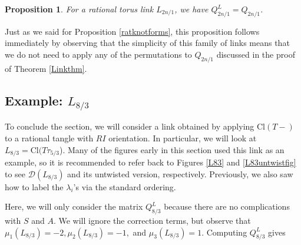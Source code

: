 \documentclass[11pt]{amsart}
\theoremstyle{plain}
\newtheorem{propositionN}[theoremN]{Proposition}
\theoremstyle{definition}
\theoremstyle{remark}
\begin{document}
\begin{propositionN}
\label{toruslinkprop}
For a rational torus link $L_{2n/1}$, we have $Q_{2n/1}^L=Q_{2n/1}$.
\end{propositionN}

Just as we said for Proposition \ref{ratknotforms}, this proposition follows immediately by observing that the simplicity of this family of links means that we do not need to apply any of the permutations to $Q_{2n/1}$ discussed in the proof of Theorem \ref{Linkthm}. 

\subsection{Example: $L_{8/3}$}

To conclude the section, we will consider a link obtained by applying $\text{Cl}(T-)$ to a rational tangle with $RI$ orientation. In particular, we will look at $L_{8/3}=\text{Cl}(T\tau_{5/3}$). Many of the figures early in this section used this link as an example, so it is recommended to refer back to Figures \ref{L83} and \ref{L83untwistfig} to see $\mathcal{D}(L_{8/3})$ and its untwisted version, respectively. Previously, we also saw how to label the $\lambda_i$'s via the standard ordering.

Here, we will only consider the matrix $Q_{8/3}^L$ because there are no complications with $S$ and $A$. We will ignore the correction terms, but observe that $\mu_1(L_{8/3})=-2, \mu_2(L_{8/3})=-1,$ and $\mu_3(L_{8/3})=1$. Computing $Q_{8/3}^L$  gives
\end{document}
